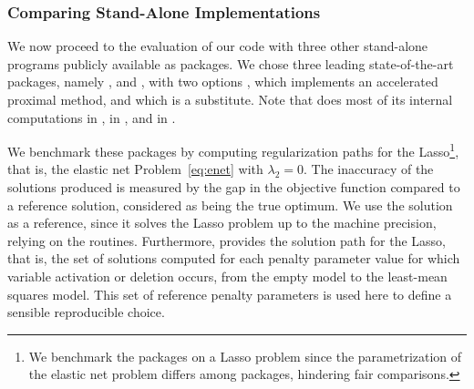 \subsubsection{Comparing Stand-Alone Implementations}

We  now  proceed  to the  evaluation  of  our  code with  three  other
stand-alone programs publicly  available as  packages.  We
chose     three    leading    state-of-the-art     packages,    namely
  \citep[Generalized  Linear  Models  regularized  by
Lasso    and    elastic-NET,][]{2009_JSS_Friedman},    
\citep[Least      Angle     Regression,     lasso      and     forward
Stagewise,][]{2004_AS_Efron}    and      \citep[SPArse
Modeling     Software,][]{2012_FML_Bach},     with     two     options
,  which   implements  an  accelerated  proximal
method,   and     which   is  a   
substitute.   Note that   does  most of  its internal
computations  in ,   in ,
and   in .   


We benchmark these packages by computing  regularization paths for the
Lasso\footnote{%
  We benchmark the packages on a Lasso problem since the parametrization of the
  elastic net problem differs among packages, hindering fair comparisons.},
that is, the elastic net Problem~\eqref{eq:enet} with $\lambda_2=0$.   
%
The inaccuracy of the solutions produced is measured by the gap in the objective
function compared to a reference solution, considered as being the true optimum.  
\iflong
  We use the  solution as a reference, since it solves the Lasso problem
  up to the machine precision, relying on the  routines. 
  Furthermore,  provides the solution path for the Lasso,
  that is, the set of solutions computed for each penalty parameter value
  for which variable activation or deletion occurs, from the empty model to the
  least-mean squares model.
  This set of reference penalty parameters is used here to define a sensible reproducible choice.

